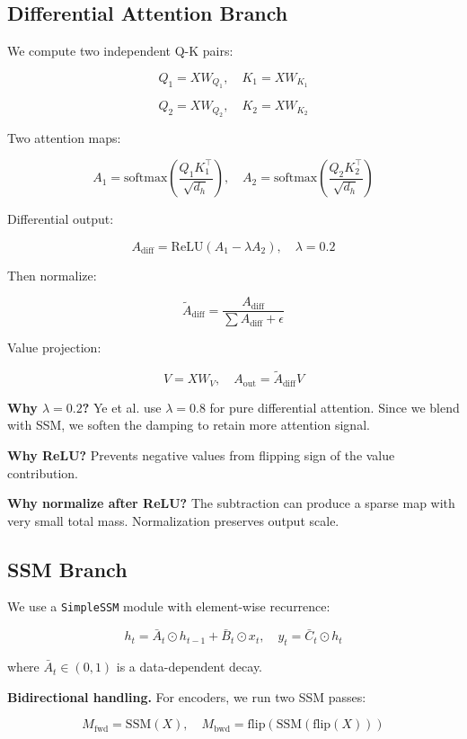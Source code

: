 \subsection{Differential Attention Branch}

We compute two independent Q-K pairs:

\[
Q_1 = X W_{Q_1}, \quad K_1 = X W_{K_1}
\tag{4.1}
\]

\[
Q_2 = X W_{Q_2}, \quad K_2 = X W_{K_2}
\tag{4.2}
\]

Two attention maps:

\[
A_1 = \text{softmax}\!\left(\frac{Q_1 K_1^\top}{\sqrt{d_h}}\right), \quad
A_2 = \text{softmax}\!\left(\frac{Q_2 K_2^\top}{\sqrt{d_h}}\right)
\tag{4.3}
\]

Differential output:

\[
A_\text{diff} = \text{ReLU}(A_1 - \lambda A_2), \quad \lambda = 0.2
\tag{4.4}
\]

Then normalize:

\[
\tilde{A}_\text{diff} = \frac{A_\text{diff}}{\sum A_\text{diff} + \epsilon}
\tag{4.5}
\]

Value projection:

\[
V = X W_V, \quad A_\text{out} = \tilde{A}_\text{diff} V
\tag{4.6}
\]

\textbf{Why $\lambda = 0.2$?} Ye et al. use $\lambda = 0.8$ for pure differential 
attention. Since we blend with SSM, we soften the damping to retain more 
attention signal.

\textbf{Why ReLU?} Prevents negative values from flipping sign of the value 
contribution.

\textbf{Why normalize after ReLU?} The subtraction can produce a sparse map with 
very small total mass. Normalization preserves output scale.

\subsection{SSM Branch}

We use a \texttt{SimpleSSM} module with element-wise recurrence:

\[
h_t = \bar{A}_t \odot h_{t-1} + \bar{B}_t \odot x_t, \quad
y_t = \bar{C}_t \odot h_t
\tag{4.7}
\]

where $\bar{A}_t \in (0, 1)$ is a data-dependent decay.

\textbf{Bidirectional handling.} For encoders, we run two SSM passes:

\[
M_\text{fwd} = \text{SSM}(X), \quad
M_\text{bwd} = \text{flip}(\text{SSM}(\text{flip}(X)))
\tag{4.8}
\]

